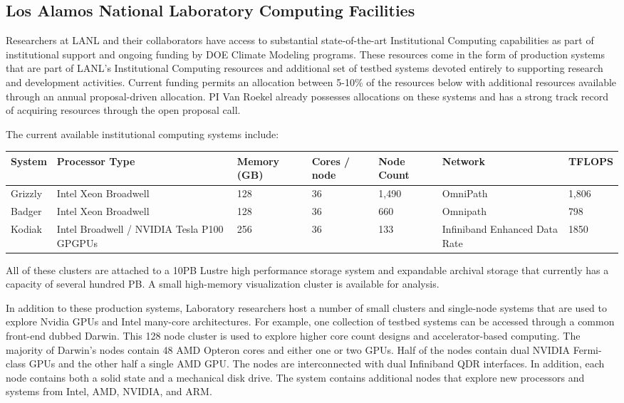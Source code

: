 
\subsection{Los Alamos National Laboratory Computing Facilities}
\label{sec:facilities}
Researchers at LANL and their collaborators have access to substantial
state-of-the-art Institutional Computing capabilities as part of institutional
support and ongoing funding by DOE Climate Modeling programs. 
These resources
come in the form of production systems that are part of LANL's
Institutional Computing resources and additional set of testbed
systems devoted entirely to supporting research and development
activities.
Current funding permits an allocation between 5-10\% of the resources below
with additional resources available through an annual proposal-driven
allocation. PI Van Roekel already possesses allocations on these systems and has a strong track record of acquiring resources through the open proposal call.


The current available institutional computing systems include: 
\begin{center}
  \begin{tabular}{|p{0.75in}|p{0.7in}|p{0.6in}|p{0.5in}|p{0.45in}|p{0.75in}|l|}
  \hline 
  \textbf{System} & \textbf{Processor Type} & \textbf{Memory (GB)} & \textbf{Cores / node} & \textbf{Node Count} & \textbf{Network} & \textbf{TFLOPS}\\
  \hline
  \hline 
  Grizzly & Intel Xeon Broadwell & 128 & 36  & 1,490 & OmniPath & 1,806  \\
  \hline
  Badger    & Intel Xeon Broadwell & 128 & 36 & 660 & Omnipath &  798 \\
  \hline
  Kodiak     & Intel Broadwell / NVIDIA Tesla P100 GPGPUs & 256 & 36 & 133 & Infiniband Enhanced Data Rate   & 1850 \\
  \hline
  \end{tabular}
\end{center}

All of these clusters are attached to a 10PB Lustre high performance storage
system and expandable archival storage that currently has a capacity of several
hundred PB. A small high-memory visualization cluster is available for
analysis.

In addition to these production systems, Laboratory researchers host a number
of small clusters and single-node systems that are used to explore Nvidia GPUs
and Intel many-core architectures. 
For example, one collection of testbed systems can be accessed through
a common front-end dubbed Darwin.  This 128 node cluster is used
to explore higher core count designs and accelerator-based computing.
The majority of Darwin's nodes contain 48 AMD Opteron cores and either
one or two GPUs.  Half of the nodes contain dual NVIDIA Fermi-class
GPUs and the other half a single AMD GPU. The nodes are interconnected
with dual Infiniband QDR interfaces.  In addition, each node contains
both a solid state and a mechanical disk drive.  The system contains
additional nodes that explore new processors and systems from Intel,
AMD, NVIDIA, and ARM. 





